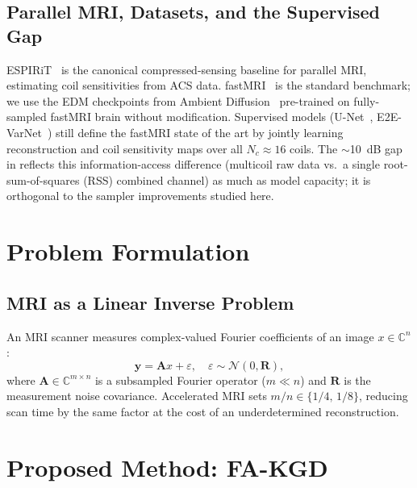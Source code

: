 \documentclass[conference]{IEEEtran}
\begin{document}
\subsection{Parallel MRI, Datasets, and the Supervised Gap}

ESPIRiT~\cite{uecker2014espirit} is the canonical compressed-sensing baseline
for parallel MRI, estimating coil sensitivities from ACS data.
fastMRI~\cite{zbontar2018fastmri} is the standard benchmark; we use the EDM
checkpoints from Ambient Diffusion~\cite{daras2025ambient} pre-trained on
fully-sampled fastMRI brain without modification. Supervised models
(U-Net~\cite{zbontar2018fastmri}, E2E-VarNet~\cite{sriram2020varnet}) still define the fastMRI state of the
art by jointly learning reconstruction and coil sensitivity maps over all
$N_c\!\approx\!16$ coils. The $\sim$10~dB gap in 
reflects this information-access difference (multicoil raw data vs.\ a single
root-sum-of-squares (RSS) combined channel) as much as model capacity;
it is orthogonal to the
sampler improvements studied here.

\section{Problem Formulation}
\label{sec:problem}

\subsection{MRI as a Linear Inverse Problem}

An MRI scanner measures complex-valued Fourier coefficients of an image
$x \in \mathbb{C}^n$:
\begin{equation}
  \mathbf{y} = \mathbf{A}x + \varepsilon, \quad
  \varepsilon \sim \mathcal{N}(0, \mathbf{R}),
  \label{eq:forward}
\end{equation}
where $\mathbf{A} \in \mathbb{C}^{m \times n}$ is a subsampled Fourier
operator ($m \ll n$) and $\mathbf{R}$ is the measurement noise covariance.
Accelerated MRI sets $m/n \in \{1/4,\, 1/8\}$, reducing scan time by the
same factor at the cost of an underdetermined reconstruction.

\section{Proposed Method: FA-KGD}
\label{sec:method}
\end{document}
